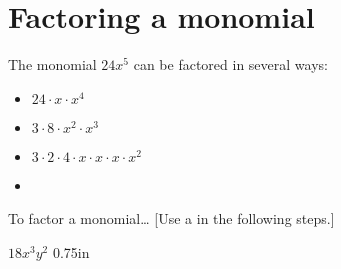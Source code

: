\section{Factoring a monomial}

The monomial $24x^5$ can be factored in several ways:

\begin{minipage}{0.49\textwidth}
\begin{itemize}[nosep]
    \item $24 \cdot x \cdot x^4 $
    \item $ 3 \cdot 8 \cdot x^2 \cdot x^3 $
\end{itemize}
\end{minipage}
\begin{minipage}{0.49\textwidth}
    \begin{itemize}[nosep]
        \item $ 3 \cdot 2 \cdot 4 \cdot x \cdot x \cdot x \cdot x^2 $
        \item {}
    \end{itemize}
\end{minipage}
    
\begin{myConceptSteps}{To  factor a monomial\dots}
    [Use a   in the following steps.]
\end{myConceptSteps}


    {
        $ 18 x^3y^2 $
    }
    {0.75in}


